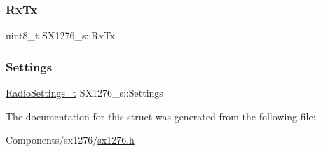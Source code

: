 \subsubsection{\texorpdfstring{Rx\+Tx}{RxTx}}
{\footnotesize\ttfamily uint8\+\_\+t S\+X1276\+\_\+s\+::\+Rx\+Tx}

\mbox{\label{structSX1276__s_aacf7afe5f1c4e05bc4822255dc8a123c}} 
\subsubsection{\texorpdfstring{Settings}{Settings}}
{\footnotesize\ttfamily \hyperlink{structRadioSettings__t}{Radio\+Settings\+\_\+t} S\+X1276\+\_\+s\+::\+Settings}



The documentation for this struct was generated from the following file\+:\begin{DoxyCompactItemize}
\item 
Components/sx1276/\hyperlink{sx1276_8h}{sx1276.\+h}\end{DoxyCompactItemize}
